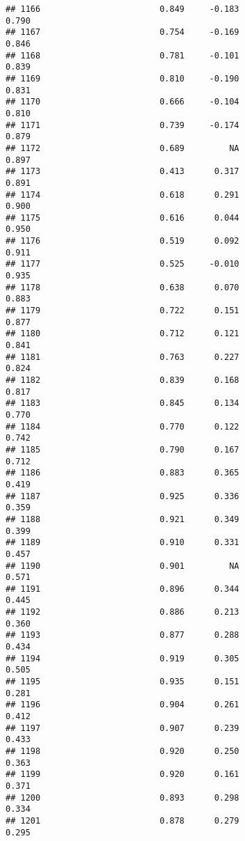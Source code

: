\documentclass[
]{article}
\begin{document}
\begin{verbatim}
## 1166                        0.849     -0.183                     0.790
## 1167                        0.754     -0.169                     0.846
## 1168                        0.781     -0.101                     0.839
## 1169                        0.810     -0.190                     0.831
## 1170                        0.666     -0.104                     0.810
## 1171                        0.739     -0.174                     0.879
## 1172                        0.689         NA                     0.897
## 1173                        0.413      0.317                     0.891
## 1174                        0.618      0.291                     0.900
## 1175                        0.616      0.044                     0.950
## 1176                        0.519      0.092                     0.911
## 1177                        0.525     -0.010                     0.935
## 1178                        0.638      0.070                     0.883
## 1179                        0.722      0.151                     0.877
## 1180                        0.712      0.121                     0.841
## 1181                        0.763      0.227                     0.824
## 1182                        0.839      0.168                     0.817
## 1183                        0.845      0.134                     0.770
## 1184                        0.770      0.122                     0.742
## 1185                        0.790      0.167                     0.712
## 1186                        0.883      0.365                     0.419
## 1187                        0.925      0.336                     0.359
## 1188                        0.921      0.349                     0.399
## 1189                        0.910      0.331                     0.457
## 1190                        0.901         NA                     0.571
## 1191                        0.896      0.344                     0.445
## 1192                        0.886      0.213                     0.360
## 1193                        0.877      0.288                     0.434
## 1194                        0.919      0.305                     0.505
## 1195                        0.935      0.151                     0.281
## 1196                        0.904      0.261                     0.412
## 1197                        0.907      0.239                     0.433
## 1198                        0.920      0.250                     0.363
## 1199                        0.920      0.161                     0.371
## 1200                        0.893      0.298                     0.334
## 1201                        0.878      0.279                     0.295

\end{verbatim}
\end{document}
